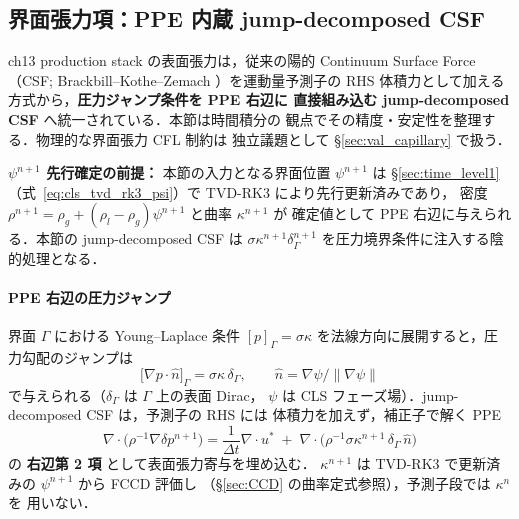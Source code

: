 \subsection{界面張力項：PPE 内蔵 jump-decomposed CSF}
\label{sec:time_csf}

ch13 production stack の表面張力は，従来の陽的 Continuum Surface Force
（CSF; Brackbill--Kothe--Zemach \cite{Brackbill1992}）を運動量予測子の RHS
体積力として加える方式から，\textbf{圧力ジャンプ条件を PPE 右辺に
直接組み込む jump-decomposed CSF} へ統一されている．本節は時間積分の
観点でその精度・安定性を整理する．物理的な界面張力 CFL 制約は
独立議題として §\ref{sec:val_capillary} で扱う．

\noindent\textbf{$\psi^{n+1}$ 先行確定の前提：}
本節の入力となる界面位置 $\psi^{n+1}$ は §\ref{sec:time_level1}
（式~\eqref{eq:cls_tvd_rk3_psi}）で TVD-RK3 により先行更新済みであり，
密度 $\rho^{n+1}=\rho_g+(\rho_l-\rho_g)\psi^{n+1}$ と曲率 $\kappa^{n+1}$ が
確定値として PPE 右辺に与えられる．本節の jump-decomposed CSF は
$\sigma\kappa^{n+1}\delta_\Gamma^{n+1}$ を圧力境界条件に注入する陰的処理となる．

\paragraph{PPE 右辺の圧力ジャンプ}
界面 $\Gamma$ における Young--Laplace 条件 $[p]_\Gamma = \sigma\kappa$
を法線方向に展開すると，圧力勾配のジャンプは
\begin{equation}
  \bigl[\nabla p\cdot\hat{n}\bigr]_\Gamma = \sigma\kappa\,\delta_\Gamma,
  \qquad \hat{n} = \nabla\psi/\|\nabla\psi\|
  \label{eq:pressure_jump_csf}
\end{equation}
で与えられる（$\delta_\Gamma$ は $\Gamma$ 上の表面 Dirac，
$\psi$ は CLS フェーズ場）．jump-decomposed CSF は，予測子の RHS には
体積力を加えず，補正子で解く PPE
\begin{equation}
  \nabla\!\cdot\!\bigl(\rho^{-1}\nabla\delta p^{n+1}\bigr)
  = \frac{1}{\Delta t}\nabla\!\cdot u^{*}
  \;+\;\nabla\!\cdot\!\bigl(\rho^{-1}\sigma\kappa^{n+1}\,\delta_\Gamma\,\hat{n}\bigr)
  \label{eq:ppe_jump_decomposed}
\end{equation}
の \textbf{右辺第 2 項} として表面張力寄与を埋め込む．
$\kappa^{n+1}$ は TVD-RK3 で更新済みの $\psi^{n+1}$ から FCCD 評価し
（§\ref{sec:CCD} の曲率定式参照），予測子段では $\kappa^{n}$ を
用いない．

